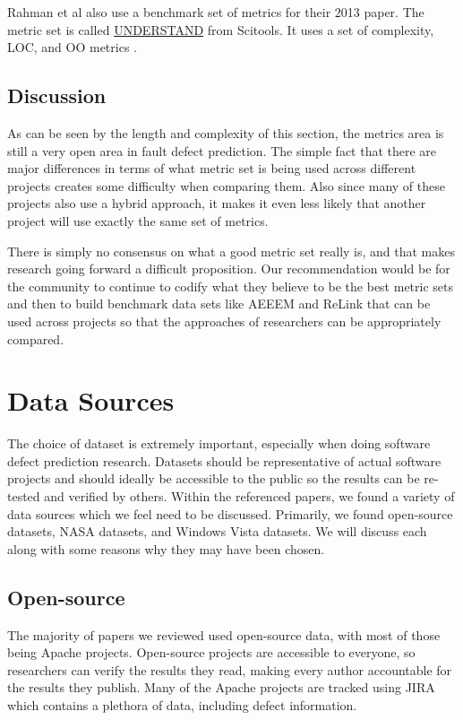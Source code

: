 \documentclass{sig-alternate-05-2015}
\begin{document}
Rahman et al also use a benchmark set of metrics for their 2013 paper.  The metric set is called \href{https://scitools.com/feature/metrics/}{UNDERSTAND} from Scitools.  It uses a set of complexity, LOC, and OO metrics \cite{Rahman13}.

\subsection{Discussion}
As can be seen by the length and complexity of this section, the metrics area is still a very open area in fault defect prediction.  The simple fact that there are major differences in terms of what metric set is being used across different projects creates some difficulty when comparing them.  Also since many of these projects also use a hybrid approach, it makes it even less likely that another project will use exactly the same set of metrics.  

There is simply no consensus on what a good metric set really is, and that makes research going forward a difficult proposition.  Our recommendation would be for the community to continue to codify what they believe to be the best metric sets and then to build benchmark data sets like AEEEM and ReLink that can be used across projects so that the approaches of researchers can be appropriately compared. 

\section{Data Sources}
The choice of dataset is extremely important, especially when doing software defect prediction research. Datasets should be representative of actual software projects and should ideally be accessible to the public so the results can be re-tested and verified by others. Within the referenced papers, we found a variety of data sources which we feel need to be discussed. Primarily, we found open-source datasets, NASA datasets, and Windows Vista datasets. We will discuss each along with some reasons why they may have been chosen.
\subsection{Open-source}
The majority of papers we reviewed used open-source data, with most of those being Apache projects. Open-source projects are accessible to everyone, so researchers can verify the results they read, making every author accountable for the results they publish. Many of the Apache projects are tracked using JIRA which contains a plethora of data, including defect information.
\end{document}
